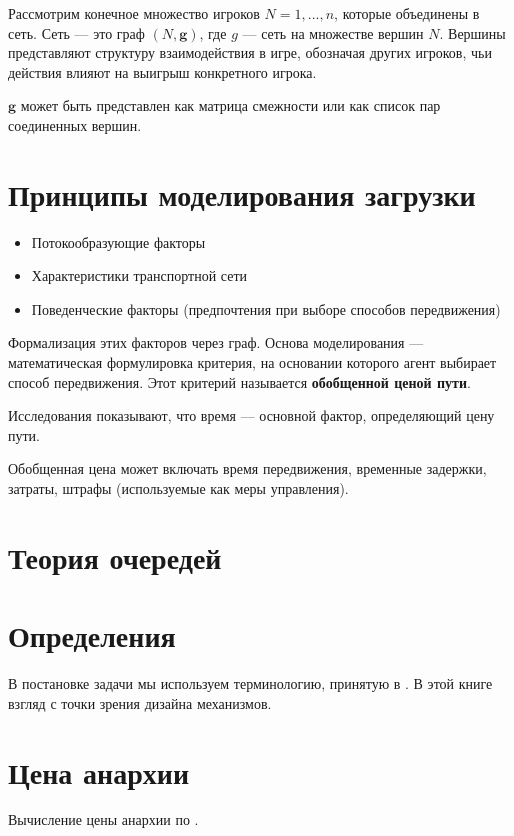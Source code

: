 Рассмотрим конечное множество игроков $N = {1,...,n}$, которые объединены в сеть. 
Сеть --- это граф $(N, \mathbf{g})$, где $g$ --- сеть на множестве вершин $N$.
Вершины представляют структуру взаимодействия в игре, обозначая других игроков, чьи действия влияют на выигрыш конкретного игрока.

$\mathbf{g}$ может быть представлен как матрица смежности или как список пар соединенных вершин.


\section{Принципы моделирования загрузки}
\begin{itemize}
	\item Потокообразующие факторы
	\item Характеристики транспортной сети
	\item Поведенческие факторы (предпочтения при выборе способов передвижения)
\end{itemize}

Формализация этих факторов через граф.
Основа моделирования — математическая формулировка критерия, на основании которого агент выбирает способ передвижения. Этот критерий называется \textbf{обобщенной ценой пути}.

Исследования показывают, что время --- основной фактор, определяющий цену пути.\cite[4]{matmod_shvetsov}

Обобщенная цена может включать время передвижения, временные задержки, затраты, штрафы (используемые как меры управления).


\section{Теория очередей}


\section{Определения}
В постановке задачи мы используем терминологию, принятую в \cite[с. 461, Tim Roughgarden, Routing games]{agt2007}.
В этой книге взгляд с точки зрения дизайна механизмов.

\section{Цена анархии}
\cite{rough2001}
\cite{rough2005}

Вычисление цены анархии по \cite[69]{rough2005}.



